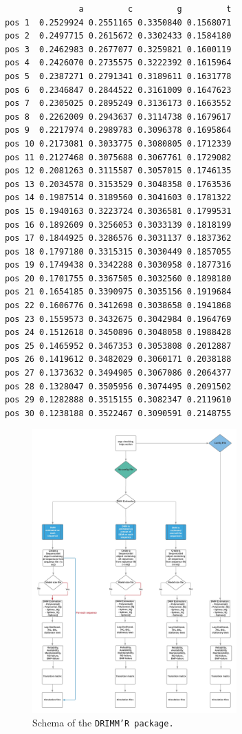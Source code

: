 \documentclass[article,nojss]{jss}\usepackage[]{graphicx}\usepackage[]{color}
\begin{document}
\begin{lstlisting}
               a         c         g         t
pos 1  0.2529924 0.2551165 0.3350840 0.1568071
pos 2  0.2497715 0.2615672 0.3302433 0.1584180
pos 3  0.2462983 0.2677077 0.3259821 0.1600119
pos 4  0.2426070 0.2735575 0.3222392 0.1615964
pos 5  0.2387271 0.2791341 0.3189611 0.1631778
pos 6  0.2346847 0.2844522 0.3161009 0.1647623
pos 7  0.2305025 0.2895249 0.3136173 0.1663552
pos 8  0.2262009 0.2943637 0.3114738 0.1679617
pos 9  0.2217974 0.2989783 0.3096378 0.1695864
pos 10 0.2173081 0.3033775 0.3080805 0.1712339
pos 11 0.2127468 0.3075688 0.3067761 0.1729082
pos 12 0.2081263 0.3115587 0.3057015 0.1746135
pos 13 0.2034578 0.3153529 0.3048358 0.1763536
pos 14 0.1987514 0.3189560 0.3041603 0.1781322
pos 15 0.1940163 0.3223724 0.3036581 0.1799531
pos 16 0.1892609 0.3256053 0.3033139 0.1818199
pos 17 0.1844925 0.3286576 0.3031137 0.1837362
pos 18 0.1797180 0.3315315 0.3030449 0.1857055
pos 19 0.1749438 0.3342288 0.3030958 0.1877316
pos 20 0.1701755 0.3367505 0.3032560 0.1898180
pos 21 0.1654185 0.3390975 0.3035156 0.1919684
pos 22 0.1606776 0.3412698 0.3038658 0.1941868
pos 23 0.1559573 0.3432675 0.3042984 0.1964769
pos 24 0.1512618 0.3450896 0.3048058 0.1988428
pos 25 0.1465952 0.3467353 0.3053808 0.2012887
pos 26 0.1419612 0.3482029 0.3060171 0.2038188
pos 27 0.1373632 0.3494905 0.3067086 0.2064377
pos 28 0.1328047 0.3505956 0.3074495 0.2091502
pos 29 0.1282888 0.3515155 0.3082347 0.2119610
pos 30 0.1238188 0.3522467 0.3090591 0.2148755
\end{lstlisting}




%




\clearpage

\begin{figure}[htbp]
\centering
\includegraphics[width=0.7\textwidth]{fig}
\caption{Schema of the \tt{DRIMM'R} package. } \label{fig}
\end{figure}
\end{document}
